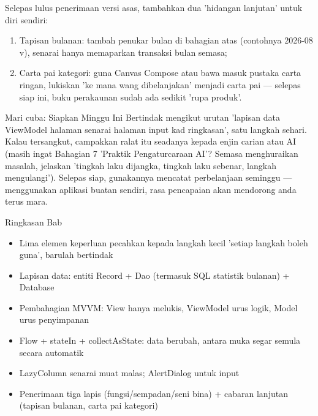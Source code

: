Selepas lulus penerimaan versi asas, tambahkan dua 'hidangan lanjutan' untuk diri sendiri:

\begin{enumerate}
  \item Tapisan bulanan: tambah penukar bulan di bahagian atas (contohnya 2026-08 v), senarai hanya memaparkan transaksi bulan semasa;
  \item Carta pai kategori: guna Canvas Compose atau bawa masuk pustaka carta ringan, lukiskan 'ke mana wang dibelanjakan' menjadi carta pai — selepas siap ini, buku perakaunan sudah ada sedikit 'rupa produk'.
\end{enumerate}

\begin{tcbpractice}{Mari cuba: Siapkan Minggu Ini}
Bertindak mengikut urutan 'lapisan data ViewModel halaman senarai halaman input kad ringkasan', satu langkah sehari. Kalau tersangkut, campakkan ralat itu seadanya kepada enjin carian atau AI (masih ingat Bahagian 7 'Praktik Pengaturcaraan AI'? Semasa menghuraikan masalah, jelaskan 'tingkah laku dijangka, tingkah laku sebenar, langkah mengulangi'). Selepas siap, gunakannya mencatat perbelanjaan seminggu — menggunakan aplikasi buatan sendiri, rasa pencapaian akan mendorong anda terus mara.

\end{tcbpractice}

\begin{tcbsummary}{Ringkasan Bab}
\begin{itemize}
  \item Lima elemen keperluan pecahkan kepada langkah kecil 'setiap langkah boleh guna', barulah bertindak
  \item Lapisan data: entiti Record + Dao (termasuk SQL statistik bulanan) + Database
  \item Pembahagian MVVM: View hanya melukis, ViewModel urus logik, Model urus penyimpanan
  \item Flow + stateIn + collectAsState: data berubah, antara muka segar semula secara automatik
  \item LazyColumn senarai muat malas; AlertDialog untuk input
  \item Penerimaan tiga lapis (fungsi/sempadan/seni bina) + cabaran lanjutan (tapisan bulanan, carta pai kategori)
\end{itemize}

\end{tcbsummary}
